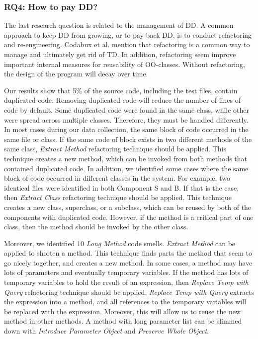 
\subsubsection{RQ4: How to pay DD?} 
The last research question is related to the management of DD. A common approach to keep DD from growing, or to pay back DD, is to conduct refactoring and re-engineering. Codabux et al.\cite{p8-codabux} mention that refactoring is a common way to manage and ultimately get rid of TD. In addition, refactoring seem improve important internal measures for reusability of OO-classes\cite{moser2006does}. Without refactoring, the design of the program will decay over time. 

Our results show that 5\% of the source code, including the test files, contain duplicated code. Removing duplicated code will reduce the number of lines of code by default. Some duplicated code were found in the same class, while other were spread across multiple classes. Therefore, they must be handled differently. In most cases during our data collection, the same block of code occurred in the same file or class. If the same code of block exists in two different methods of the same class, \textit{Extract Method} refactoring technique should be applied. This technique creates a new method, which can be invoked from both methods that contained duplicated code\cite{fowler1999refactoring}. In addition, we identified some cases where the same block of code occurred in different classes in the system. For example, two identical files were identified in both Component S and B. If that is the case, then \textit{Extract Class} refactoring technique should be applied. This technique creates a new class, superclass, or a subclass, which can be reused by both of the components with duplicated code. However, if the method is a critical part of one class, then the method should be invoked by the other class.

Moreover, we identified 10 \textit{Long Method} code smells. \textit{Extract Method} can be applied to shorten a method. This technique finds parts the method that seem to go nicely together, and creates a new method\cite{fowler1999refactoring}. In some cases, a method may have lots of parameters and eventually temporary variables. If the method has lots of temporary variables to hold the result of an expression, then \textit{Replace Temp with Query} refactoring technique should be applied\cite{fowler1999refactoring}. \textit{Replace Temp with Query} extracts the expression into a method, and all references to the temporary variables will be replaced with the expression. Moreover, this will allow us to reuse the new method in other methods. A method with long parameter list can be slimmed down with \textit{Introduce Parameter Object} and \textit{Preserve Whole Object}\cite{fowler1999refactoring}.

